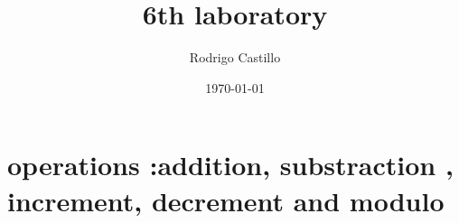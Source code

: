 \documentclass[10pt,a4paper]{article} %
\begin{document}
    \title{{  6th laboratory  }}
    \author{{Rodrigo Castillo}}
    \date{\today}

    \maketitle





    \section{operations :addition, substraction , increment, decrement and modulo}
\end{document}
